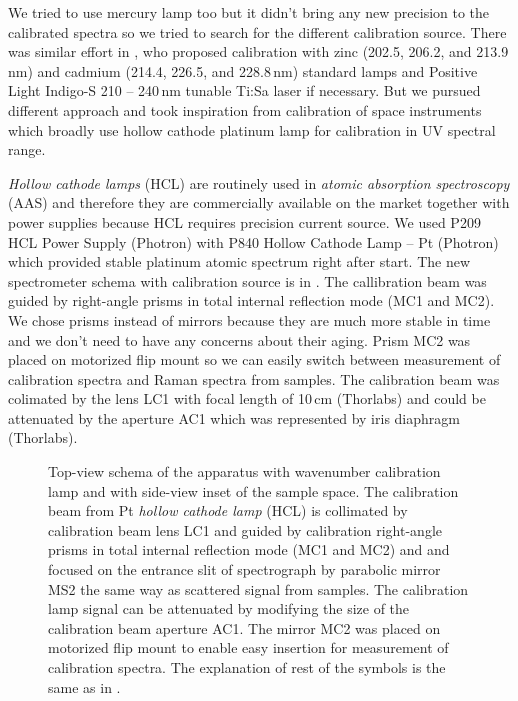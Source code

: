 We tried to use mercury lamp too but it didn't bring any new precision to the
calibrated spectra so we tried to search for the different calibration source.
There was similar effort in \textcite{Wert2014}, who proposed calibration with
zinc (202.5, 206.2, and 213.9\,nm) and cadmium (214.4, 226.5, and 228.8\,nm)
standard lamps and Positive Light Indigo-S 210 -- 240\,nm tunable Ti:Sa laser
if necessary. But we pursued different approach and took inspiration from
calibration of space instruments which broadly use hollow cathode platinum
lamp \parencite{Mount1977,Reader1990,Sansonetti1992} for calibration in UV
spectral range.

\emph{Hollow cathode lamps} (HCL) are routinely used in \emph{atomic absorption
spectroscopy} (AAS) and therefore they are commercially available on the market
together with power supplies because HCL requires precision current source. We
used P209 HCL Power Supply (Photron) with P840 Hollow Cathode Lamp -- Pt
(Photron) which provided stable platinum atomic spectrum right after start. The
new spectrometer schema with calibration source is in
.
The callibration beam was guided by right-angle prisms in total internal
reflection mode (MC1 and MC2). We chose prisms instead of mirrors because they
are much more stable in time and we don't need to have any concerns about their
aging. Prism MC2 was placed on motorized flip mount so we can easily switch
between measurement of calibration spectra and Raman spectra from samples.
The calibration beam was colimated by the lens LC1 with focal length of
10\,cm (Thorlabs) and could be attenuated by the aperture AC1 which was
represented by iris diaphragm (Thorlabs).

\begin{figure}
	\centering
	
	\caption{Top-view schema of the apparatus with wavenumber calibration lamp
		and with side-view inset of the sample space. The calibration beam from Pt
		\emph{hollow cathode lamp} (HCL) is collimated by calibration beam lens
		LC1 and guided by calibration right-angle prisms in total internal
		reflection mode (MC1 and MC2) and and focused on the entrance slit of
		spectrograph by parabolic mirror MS2 the same way as scattered signal from
		samples. The calibration lamp signal can be attenuated by modifying the
		size of the calibration beam aperture AC1. The mirror MC2 was placed on
		motorized flip mount to enable easy insertion for measurement of
		calibration spectra. The explanation of rest of the symbols is the same as
		in
		.}
	\label{\figlabel{wavenumber_calibration:apparatus_schema}}
\end{figure}

